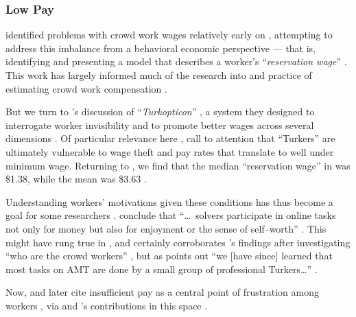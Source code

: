\documentclass[trackingWork]{subfiles}
\begin{document}
{    \subsubsection{Low Pay}


    \citeauthor{laborEconomicsOfCrowdsourcingHorton}
    identified problems with crowd work wages relatively early on%
,     attempting to address this imbalance from a behavioral economic perspective ---
    that is, identifying and presenting a model that describes a worker's
    ``\textit{reservation wage}''
    \cite{laborEconomicsOfCrowdsourcingHorton}.
    This work has largely informed much of the research into and practice of estimating crowd work compensation
    \cite{incentivesShaw,paolacci2010running}.

    But we turn to \citeauthor{turkopticon}'s discussion of ``\textit{Turkopticon}''%
,     a system they designed to interrogate worker invisibility and to promote better wages across several dimensions
    \cite{turkopticon}.
    Of particular relevance here%
,     \citeauthor{turkopticon} call to attention that ``Turkers'' are ultimately vulnerable to
    wage theft and
    pay rates that translate to well under minimum wage.
    Returning to \citeauthor{laborEconomicsOfCrowdsourcingHorton}%
,     we find that the median ``reservation wage'' in \citeyear{laborEconomicsOfCrowdsourcingHorton}
    was \$1.38, while the mean was \$3.63
    \cite{laborEconomicsOfCrowdsourcingHorton}.

    Understanding workers' motivations given these conditions has thus become a goal for some researchers
    \cite{whyWouldAnyoneBrewer}.
    \citeauthor{Sun20111033} conclude that
    ``\dots~solvers participate in online tasks
    not only for money
    but also for enjoyment
    or the sense of self--worth''
    \cite{Sun20111033}.
    This might have rung true in \citeyear{Sun20111033}%
,     and certainly corroborates \citeauthor{Ross}'s findings after investigating
    ``who are the crowd workers''%
,     but as \citeauthor{whoareNOTtheTurkers} points out
    ``we [have since] learned that most tasks on AMT are done by a small group of professional Turkers\dots''
    \cite{Ross,whoareNOTtheTurkers}.

    Now, \citeauthor{turkopticon}
    and later
    \citeauthor{dynamo} cite insufficient pay as a central point of frustration among workers%
,     via \citeauthor{irani2015cultural} and \citeauthor{dawnDigitalSweatshopCushing}'s contributions in this space
    \cite{dynamo,irani2015cultural,dawnDigitalSweatshopCushing,turkopticon}.

}
\end{document}

